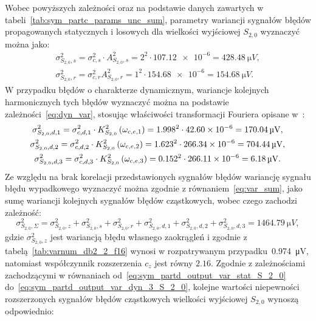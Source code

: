 Wobec powyższych zależności oraz na podstawie danych zawartych w tabeli~\ref{tab:sym_partc_params_unc_sum}, parametry wariancji sygnałów błędów propagowanych statycznych i losowych dla wielkości wyjściowej $S_{2,0}$ wyznaczyć można jako:
\begin{gather}
\sigma_{S_{2,0},s}^{2} = \sigma_{c,s}^{2} \cdot A_{S_{2,0},s}^{2} = 2^{2} \cdot \num{107.12e-6} = \qty{428.48}{\micro V} \label{eq:sym_partd_output_var_stat_S_2_0}, \\
\sigma_{S_{2,0},r}^{2} = \sigma_{c,r}^{2} A_{S_{2,0},r}^{2} = 1^{2} \cdot \num{154.68e-6} = \qty{154.68}{\micro V} \label{eq:sym_partd_output_var_rand_S_2_0}.
\end{gather}
W przypadku błędów o charakterze dynamicznym, wariancje kolejnych harmonicznych tych błędów wyznaczyć można na podstawie zależności~\eqref{eq:dyn_var}, stosując właściwości transformacji Fouriera opisane w~\cite{oppenheim_sns}:
\begin{gather}
\sigma_{S_{2,0},d,1}^{2} = \sigma_{c,d,1}^{2} \cdot K_{S_{2,0}}^{2} \left(\omega_{c,e,1}\right) = {1.998}^{2} \cdot \num{42.60e-6} = \qty{170.04}{\micro V} \label{eq:sym_partd_output_var_dyn_1_S_2_0}, \\
\sigma_{S_{2,0},d,2}^{2} = \sigma_{c,d,2}^{2} \cdot K_{S_{2,0}}^{2} \left(\omega_{c,e,2}\right) = {1.623}^{2} \cdot \num{266.34e-6} = \qty{704.44}{\micro V} \label{eq:sym_partd_output_var_dyn_2_S_2_0}, \\
\sigma_{S_{2,0},d,3}^{2} = \sigma_{c,d,3}^{2} \cdot K_{S_{2,0}}^{2} \left(\omega_{c,e,3}\right) = {0.152}^{2} \cdot \num{266.11e-6} = \qty{6.18}{\micro V} \label{eq:sym_partd_output_var_dyn_3_S_2_0}.
\end{gather}
Ze względu na brak korelacji przedstawionych sygnałów błędów wariancję sygnału błędu wypadkowego wyznaczyć można zgodnie z równaniem~\eqref{eq:var_sum}, jako sumę wariancji kolejnych sygnałów błędów cząstkowych, wobec czego zachodzi zależność:
\begin{equation}
\sigma_{S_{2,0},\Sigma}^{2} = \sigma_{S_{2,0},z}^{2} + \sigma_{S_{2,0},s}^{2} + \sigma_{S_{2,0},r}^{2} + \sigma_{S_{2,0},d,1}^{2} + \sigma_{S_{2,0},d,2}^{2} + \sigma_{S_{2,0},d,3}^{2} = \qty{1464.79}{\micro V} \label{eq:sym_partd_output_var_sum_S_2_0},
\end{equation}
gdzie $\sigma_{S_{2,0},z}^{2}$ jest wariancją błędu własnego zaokrągleń i zgodnie z tabelą~\ref{tab:varnum_db2_2_f16} wynosi w rozpatrywanym przypadku~\qty{0.974}{\micro V}, natomiast współczynnik rozszerzenia $c_{z}$ jest równy $2.16$.
Zgodnie z zależnościami zachodzącymi w równaniach od~\eqref{eq:sym_partd_output_var_stat_S_2_0} do~\eqref{eq:sym_partd_output_var_dyn_3_S_2_0}, kolejne wartości niepewności rozszerzonych sygnałów błędów cząstkowych wielkości wyjściowej $S_{2,0}$ wynoszą odpowiednio:
